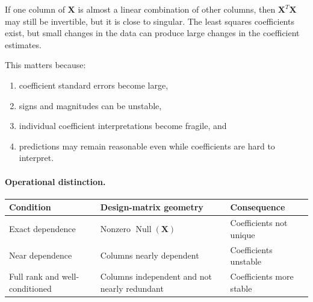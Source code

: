 If one column of \(\mathbf{X}\) is almost a linear combination of other columns, then \(\mathbf{X}^T\mathbf{X}\) may still be invertible, but it is close to singular.  The least squares coefficients exist, but small changes in the data can produce large changes in the coefficient estimates.

This matters because:
\begin{enumerate}
  \item coefficient standard errors become large,
  \item signs and magnitudes can be unstable,
  \item individual coefficient interpretations become fragile, and
  \item predictions may remain reasonable even while coefficients are hard to interpret.
\end{enumerate}

\paragraph{Operational distinction.}
\begin{center}
\begin{tabular}{|p{}|p{}|p{}|}
\hline
\textbf{Condition} & \textbf{Design-matrix geometry} & \textbf{Consequence} \\
\hline
Exact dependence & Nonzero \(\operatorname{Null}(\mathbf{X})\) & Coefficients not unique \\
\hline
Near dependence & Columns nearly dependent & Coefficients unstable \\
\hline
Full rank and well-conditioned & Columns independent and not nearly redundant & Coefficients more stable \\
\hline
\end{tabular}
\end{center}

